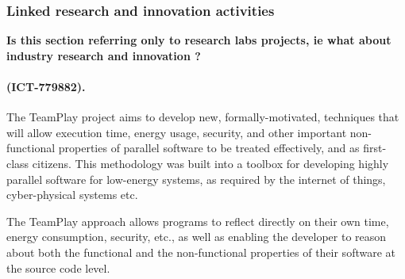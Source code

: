 \documentclass[a4paper,11pt]{article}
\newcommand{\project}[1]{\textbf{#1}\xspace}
\newcommand{\SECURITY}{\project{Security - Digital Fortress}}
\newcommand{\TheProject}{\SECURITY}
\begin{document}
\subsubsection{Linked research and innovation activities}
\label{projects}


{\color{blue}  \textbf{Is this section referring only to research labs projects, ie what about industry research and innovation ?}} 

\begin{mdframed}[backgroundcolor=blue!5]
\paragraph{\teamplay (ICT-779882).}
The TeamPlay project aims to develop new, formally-motivated, techniques that will allow execution time, energy usage, security, and other important non-functional properties of parallel software to be treated effectively, and as first-class citizens. This methodology was built into a toolbox for developing highly parallel software for low-energy systems, as required by the internet of things, cyber-physical systems etc.

The TeamPlay approach allows programs to reflect directly on their own time, energy consumption, security, etc., as well as enabling the developer to reason about both the functional and the non-functional properties of their software at the source code level.
\end{mdframed}


\end{document}
